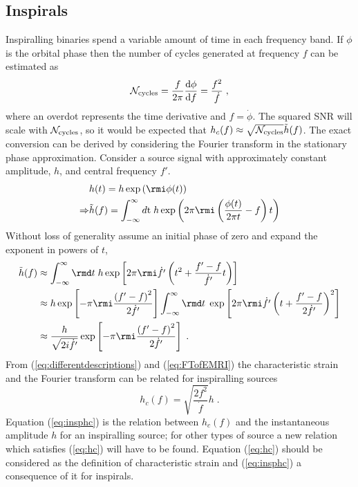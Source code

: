 \subsection{Inspirals}\label{sec:insp}
Inspiralling binaries spend a variable amount of time in each frequency band. If $\phi$ is the orbital phase then the number of cycles generated at frequency $f$ can be estimated as
\begin{equation}\label{eq:inspiral} {\cal{N}}_{\textrm{cycles}} = \frac{f}{2\pi}\frac{\textrm{d}\phi}{\textrm{d}f}=\frac{f^{2}}{\dot{f}} \; ,\end{equation}
where an overdot represents the time derivative and $f=\dot{\phi}$. The squared SNR will scale with ${\cal{N}}_{\textrm{cycles}}$, so it would be expected that $h_{c}(f)\approx \sqrt{{\cal{N}}_{\textrm{cycles}}}\tilde{h}(f)$. The exact conversion can be derived by considering the Fourier transform in the stationary phase approximation. Consider a source signal with approximately constant amplitude, $h$, and central frequency $f'$.
\begin{eqnarray}&h(t)= h\exp\left(\rmi \phi(t)\right) \\
\Rightarrow &\tilde{h}(f)=\int_{-\infty}^{\infty}d\textrm{t}\;h\exp \left(2\pi \rmi \left(\frac{\phi(t)}{2\pi t}-f\right)t\right)\end{eqnarray}
Without loss of generality assume an initial phase of zero and expand the exponent in powers of $t$,
\begin{eqnarray} \label{eq:FTofEMRI} \tilde{h}(f) &\approx \int_{-\infty}^{\infty}\rmd t\; h \exp\left[2\pi\rmi \dot{f'} \left(t^{2}+\frac{f'-f}{\dot{f'}}t\right)\right]\nonumber \\
&\approx h\exp\left[-\pi\rmi\frac{\left(f'-f\right)^{2}}{2\dot{f'}}\right]\int_{-\infty}^{\infty}\rmd t\;\exp\left[2\pi\rmi\dot{f'}\left(t+\frac{f'-f}{2\dot{f'}}\right)^{2}\right] \nonumber \\
&\approx\frac{h}{\sqrt{2i\dot{f'}}}\exp\left[-\pi\rmi\frac{\left(f'-f\right)^{2}}{2\dot{f'}}\right]\; .
\end{eqnarray}
From (\ref{eq:differentdescriptions}) and (\ref{eq:FTofEMRI}) the characteristic strain and the Fourier transform can be related for inspiralling sources \citep{FinnThorne}
\begin{equation}\label{eq:insphc}h_{c}(f) = \sqrt{\frac{2f^{2}}{\dot{f}}}h\;.\end{equation}
Equation (\ref{eq:insphc}) is the relation between $h_{c}(f)$ and the instantaneous amplitude $h$ for an inspiralling source; for other types of source a new relation which satisfies (\ref{eq:hc}) will have to be found. Equation (\ref{eq:hc}) should be considered as the definition of characteristic strain and (\ref{eq:insphc}) a consequence of it for inspirals.





